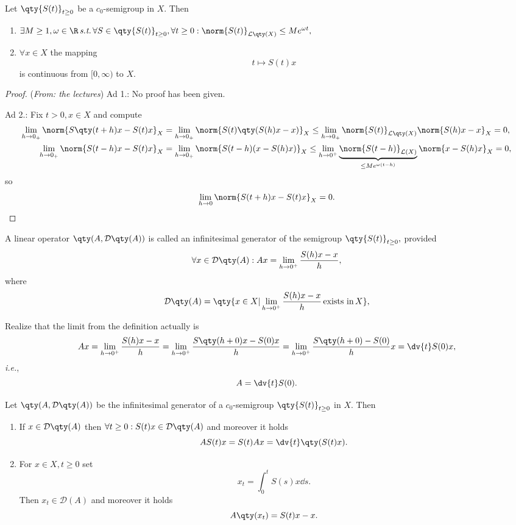 \begin{lemma}
	Let $\qty{S(t)}_{t\geq0}$ be a $c_0$-semigroup in $X$. Then 
	\begin{enumerate}
		\item $\exists M \geq 1, \omega \in \R \, \text{\textit{s.t.}} \, \forall S \in \qty{S(t)}_{t \geq 0}, \forall t \geq 0: \norm{S(t)}_{\mathcal{L}\qty(X)} \leq M e^{\omega t},$
		\item $\forall x \in X$ the mapping
			\[
				t \mapsto S(t)x 
			\]
			is continuous from $[0, \infty)$ to $X$.
	\end{enumerate}
\end{lemma}
\begin{proof}(\textit{From: the lectures})
	Ad 1.: No proof has been given.

	Ad 2.: Fix $t > 0, x \in X$ and compute
	\begin{align*}
		\lim_{h\to 0_+} \norm{S\qty(t+h)x - S(t)x}_X &= \lim_{h \to 0_+} \norm{S(t)\qty(S(h)x - x)}_X \leq \lim_{h\to 0_+}\norm{S(t)}_{\mathcal{L}\qty(X)}\norm{S(h)x - x}_{X} = 0, \\
		\lim_{h\to 0_+}\norm{S(t-h)x - S(t)x}_{X} &= \lim_{h \to 0_+}\norm{S(t-h)(x-S(h)x)}_X \leq \lim_{h \to 0^+} \underbrace{\norm{S(t-h)}_{\mathcal{L}(X)}}_{\leq Me^{\omega(t-h)}}\norm{x-S(h)x}_X = 0,
	\end{align*}
	so
	\[
		\lim_{h \to 0}\norm{S(t+h)x - S(t)x}_X = 0.
	\]
\end{proof}


\begin{definition}
	A linear operator $\qty(A, \mathcal{D}\qty(A))$ is called an infinitesimal generator of the semigroup $\qty{S(t)}_{t\geq 0},$ provided
	\[
		\forall x \in \mathcal{D}\qty(A): Ax = \lim_{h \to 0^+} \frac{S(h)x - x}{h},
	\]
	where 
	\[
		\mathcal{D}\qty(A) = \qty{ x \in X | \lim_{h\to0^+} \frac{S(h)x-x}{h} \, \text{exists in} \, X},
	\]
\end{definition}

\begin{remark}
	Realize that the limit from the definition actually is
	\[
		Ax = \lim_{h \to 0^+} \frac{S(h)x - x}{h} = \lim_{h \to 0^+} \frac{S\qty(h+ 0)x - S(0)x}{h} = \lim_{h \to 0^+}\frac{S\qty(h+0) - S(0)}{h} x= \dv{t}S(0) x,
	\]
	\textit{i.e.},
	\[
		A = \dv{t}S(0).
	\]
\end{remark}

\begin{theorem}
	Let $\qty(A, \mathcal{D}\qty(A))$ be the infinitesimal generator of a $c_0$-semigroup $\qty{S(t)}_{t \geq 0}$ in $X$. Then 
	\begin{enumerate}
		\item  If $x \in \mathcal{D}\qty(A)$ then $\forall t \geq 0: S(t)x \in \mathcal{D}\qty(A)$ and moreover it holds
			\[
				A S(t) x = S(t) A x = \dv{t}\qty(S(t)x).
			\]
		\item For $x \in X, t\geq 0$ set
			\[
				x_t = \int_0^t S(s)x \dd{s}.
			\]
			Then $x_t \in \mathcal{D}(A)$ and moreover it holds
			\[
				A\qty(x_{t}) = S(t)x - x.
			\]
	\end{enumerate}
\end{theorem}

